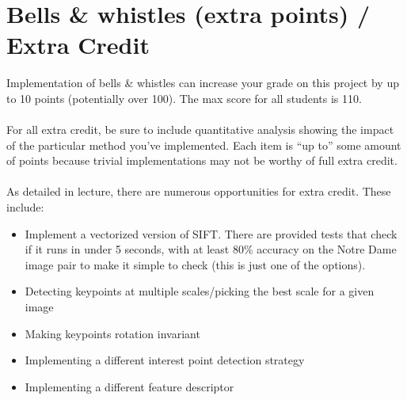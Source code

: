 \documentclass{article}
\begin{document}
\section*{Bells \& whistles (extra points) / Extra Credit}
Implementation of bells \& whistles can increase your grade on this project by up to 10 points (potentially over 100). The max score for all students is 110.
\\
\\
For all extra credit, be sure to include quantitative analysis showing the impact of the particular method you've implemented. Each item is ``up to'' some amount of points because trivial implementations may not be worthy of full extra credit.
\\
\\
As detailed in lecture, there are numerous opportunities for extra credit. These include:
\begin{itemize}
    \item Implement a vectorized version of SIFT. There are provided tests that check if it runs in under 5 seconds, with at least 80\% accuracy on the Notre Dame image pair to make it simple to check (this is just one of the options). 
    \item Detecting keypoints at multiple scales/picking the best scale for a given image
    \item Making keypoints rotation invariant
    \item Implementing a different interest point detection strategy
    \item Implementing a different feature descriptor
\end{itemize}
\end{document}
